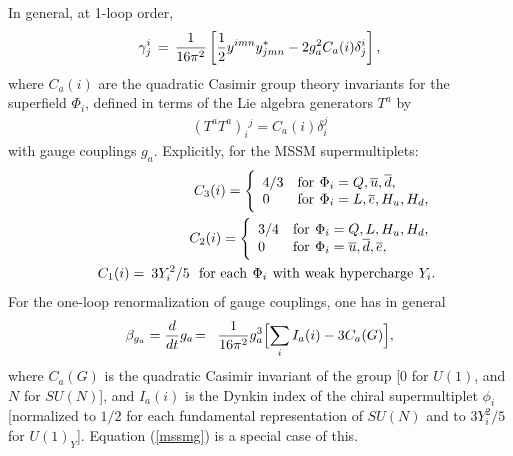 \documentclass[11pt]{article}
\def\beq{\begin{eqnarray}}
\def\eeq{\end{eqnarray}}
\def\sbar{\overline}
\def\half{{1\over 2}}
\begin{document}
In general, at 1-loop order, 
\beq
\gamma^i_j \,=\, \frac{1}{16 \pi^2} \left [
\half y^{imn} y^*_{jmn} - 2 g_a^2 C_a(i) 
\delta_j^i
\right ],
\label{eq:gengamma}
\eeq
where $C_a(i)$ are the quadratic Casimir group theory invariants for the
superfield $\Phi_i$, defined in terms of the Lie algebra generators $T^a$
by 
\beq
(T^aT^a)_i{}^{j}= C_a(i) \delta_i^j 
\label{eq:defCasimir}
\eeq 
with gauge couplings $g_a$. 
Explicitly, for the MSSM supermultiplets: 
\beq
&&
C_3(i) =
\Biggl \{ \begin{array}{ll}
4/3 & {\rm for}\>\,\Phi_i = Q, \sbar u, \sbar d,
\\
0 & {\rm for}\>\,\Phi_i = L, \sbar e, H_u, H_d,
\end{array}
\label{defC3}
\\
&&
C_2(i) =
\Biggl \{ \begin{array}{ll}
3/4 & {\rm for}\>\,\Phi_i = Q, L, H_u, H_d,\\
0 & {\rm for}\>\,\Phi_i = \sbar u, \sbar d, \sbar e
,\end{array}
\\
&&
C_1(i) = \>
3 Y_i^2/5 \>\>\>{\rm for~each}\>\,\Phi_i\>\,{\rm
with~weak~hypercharge}\>\, Y_i.
\label{defC1}
\eeq
For the one-loop renormalization of gauge couplings, one has in
general
\beq
\beta_{g_a} = 
{d\over dt} g_a 
\!&=&\! 
{1\over 16\pi^2} g_a^3 \Bigl [\sum_i I_a(i) - 3 C_a(G) \Bigr ],
\eeq
where $C_a(G)$ is the quadratic Casimir invariant of the
group [0 for $U(1)$, and $N$ for $SU(N)$], and
$I_a(i)$ is the Dynkin index of the chiral supermultiplet $\phi_i$
[normalized to $1/2$ for each fundamental representation of $SU(N)$ and
to $3 Y_i^2/5$ for $U(1)_Y$]. Equation (\ref{mssmg})
is a special case of this.
\end{document}

